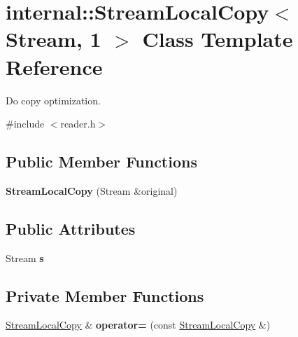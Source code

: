 \hypertarget{classinternal_1_1_stream_local_copy_3_01_stream_00_011_01_4}{}\section{internal\+:\+:Stream\+Local\+Copy$<$ Stream, 1 $>$ Class Template Reference}
\label{classinternal_1_1_stream_local_copy_3_01_stream_00_011_01_4}


Do copy optimization.  




{\ttfamily \#include $<$reader.\+h$>$}

\subsection*{Public Member Functions}
\begin{DoxyCompactItemize}
\item 
{\bfseries Stream\+Local\+Copy} (Stream \&original)\hypertarget{classinternal_1_1_stream_local_copy_3_01_stream_00_011_01_4_aba475fed3eecc9f77ff059fdb7fe2a32}{}\label{classinternal_1_1_stream_local_copy_3_01_stream_00_011_01_4_aba475fed3eecc9f77ff059fdb7fe2a32}

\end{DoxyCompactItemize}
\subsection*{Public Attributes}
\begin{DoxyCompactItemize}
\item 
Stream {\bfseries s}\hypertarget{classinternal_1_1_stream_local_copy_3_01_stream_00_011_01_4_a1d3e8ae8756325df25715d4ffb9c1b44}{}\label{classinternal_1_1_stream_local_copy_3_01_stream_00_011_01_4_a1d3e8ae8756325df25715d4ffb9c1b44}

\end{DoxyCompactItemize}
\subsection*{Private Member Functions}
\begin{DoxyCompactItemize}
\item 
\hyperlink{classinternal_1_1_stream_local_copy}{Stream\+Local\+Copy} \& {\bfseries operator=} (const \hyperlink{classinternal_1_1_stream_local_copy}{Stream\+Local\+Copy} \&)\hypertarget{classinternal_1_1_stream_local_copy_3_01_stream_00_011_01_4_ac2b9afa416fa4fc2a37156445902bfc3}{}\label{classinternal_1_1_stream_local_copy_3_01_stream_00_011_01_4_ac2b9afa416fa4fc2a37156445902bfc3}

\end{DoxyCompactItemize}
